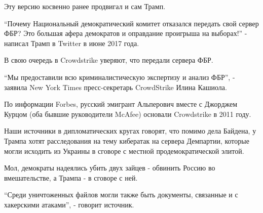Эту версию косвенно ранее продвигал и сам Трамп.

\enquote{Почему Национальный демократический комитет отказался передать свой сервер
ФБР? Это большая афера демократов и оправдание проигрыша на выборах!} - написал
Трамп в Twitter в июне 2017 года.

В свою очередь в Crowdstrike уверяют, что передали сервера ФБР.

\enquote{Мы предоставили всю криминалистическую экспертизу и анализ ФБР}, - заявила New
York Times пресс-секретарь CrowdStrike Илина Кашиола.

По информации Forbes, русский эмигрант Альперович вместе с Джорджем Курцом (оба
бывшие руководители McAfee) основали Crowdstrike в 2011 году. 

Наши источники в дипломатических кругах говорят, что помимо дела Байдена, у
Трампа хотят расследования на тему кибератак на сервера Демпартии, которые
могли исходить из Украины в сговоре с местной продемократической элитой.

Мол, демократы надеялись убить двух зайцев - обвинить Россию во вмешательстве,
а Трампа - в сговоре с ней. 

\enquote{Среди уничтоженных файлов могли также быть документы, связанные и с хакерскими
атаками}, - говорит источник.
